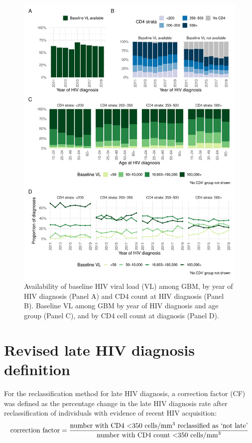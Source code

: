 \begin{figure}[htbp!]
  \centering
  \includegraphics[scale=0.6]{vl_availability_by_cd4.pdf}
  \caption[Availability of HIV viral load among GBM]{Availability of baseline HIV viral load (VL) among GBM, by year of HIV diagnosis (Panel A) and CD4 count at HIV diagnosis (Panel B). Baseline VL among GBM by year of HIV diagnosis and age group (Panel C), and by CD4 cell count at diagnosis (Panel D).}\label{fig:vl_avail}
\end{figure}

\section{Revised late HIV diagnosis definition}\label{appendix:late-diag}

For the reclassification method for late HIV diagnosis, a correction factor (CF) was defined as the percentage change in the late HIV diagnosis rate after reclassification of individuals with evidence of recent HIV acquisition\parencite{Kirwan2022-za}:
%
\[
  \text{correction factor} =  \frac{\text{number with CD4 <350 cells/mm\textsuperscript{3} reclassified as `not late'}}{\text{number with CD4 count <350 cells/mm\textsuperscript{3}}}
\]

